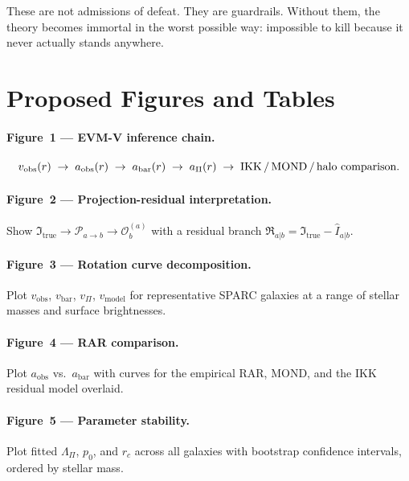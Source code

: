 \documentclass[11pt,a4paper,oneside]{article}
\newcommand{\Itrue}{\mathfrak{I}_{\mathrm{true}}}
\newcommand{\Ihat}{\widehat{I}_{a|b}}
\newcommand{\Osp}{\mathcal{O}_b}
\newcommand{\Pab}{\mathcal{P}_{a\to b}}
\newcommand{\Rresid}{\mathfrak{R}_{a|b}}
\newcommand{\aobs}{a_{\mathrm{obs}}}
\newcommand{\abar}{a_{\mathrm{bar}}}
\newcommand{\aPi}{a_{\Pi}}
\newcommand{\vobs}{v_{\mathrm{obs}}}
\newcommand{\vbar}{v_{\mathrm{bar}}}
\newcommand{\vPi}{v_{\Pi}}
\newcommand{\vmod}{v_{\mathrm{model}}}
\newcommand{\LamPi}{\Lambda_{\Pi}}
\newcommand{\pzero}{p_0}
\newcommand{\rc}{r_c}
\begin{document}
These are not admissions of defeat. They are guardrails. Without them, the theory
becomes immortal in the worst possible way: impossible to kill because it never actually
stands anywhere.

\section{Proposed Figures and Tables}

\paragraph{Figure~1 --- EVM-V inference chain.}
\[
    \vobs(r) \;\to\; \aobs(r) \;\to\; \abar(r) \;\to\; \aPi(r)
    \;\to\; \text{IKK\,/\,MOND\,/\,halo comparison.}
\]

\paragraph{Figure~2 --- Projection-residual interpretation.}
Show $\Itrue \to \Pab \to \Osp^{(a)}$ with a residual branch
$\Rresid = \Itrue - \Ihat$.

\paragraph{Figure~3 --- Rotation curve decomposition.}
Plot $\vobs$, $\vbar$, $\vPi$, $\vmod$ for representative SPARC galaxies at a range
of stellar masses and surface brightnesses.

\paragraph{Figure~4 --- RAR comparison.}
Plot $\aobs$ vs.\ $\abar$ with curves for the empirical RAR, MOND, and the IKK
residual model overlaid.

\paragraph{Figure~5 --- Parameter stability.}
Plot fitted $\LamPi$, $\pzero$, and $\rc$ across all galaxies with bootstrap confidence
intervals, ordered by stellar mass.
\end{document}
